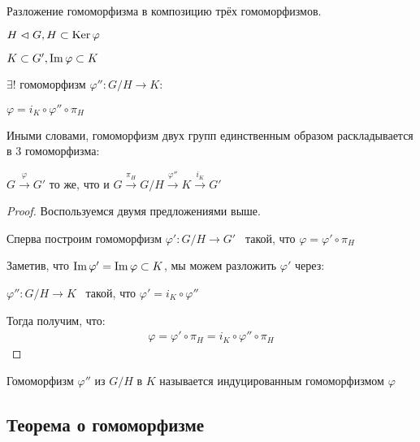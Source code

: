 \begin{theorem}
    Разложение гомоморфизма в композицию трёх гомоморфизмов.

    $H \vartriangleleft G, H \subset \operatorname{Ker} \varphi$

    $K \subset G', \operatorname{Im} \varphi \subset K$

    $\exists !$ гомоморфизм $\varphi'': G / H \to K:$

    $\varphi =  i_K \circ \varphi'' \circ \pi_H$

    Иными словами, гомоморфизм двух групп единственным образом раскладывается в 3 гомоморфизма:

    $G \stackrel{\varphi}{\to} G'$ то же, что и $G \stackrel{\pi_{H}}{\to} G/H \stackrel{\varphi''}{\to} K \stackrel{i_{K}}{\to} G'$

    \begin{proof}
        Воспользуемся двумя предложениями выше.

        Сперва построим гомоморфизм $\varphi': G / H \to G'$ \, такой, что $\varphi = \varphi' \circ \pi_H$

        Заметив, что $\operatorname{Im} \varphi' = \operatorname{Im} \varphi \subset K$, мы можем разложить $\varphi'$ через:

        $\varphi'': G / H \to K$ \, такой, что $\varphi' = i_K \circ \varphi''$

        Тогда получим, что: 
        \begin{gather*}
            \varphi = \varphi' \circ \pi_H = i_K \circ \varphi'' \circ \pi_H
        \end{gather*}
    \end{proof}

    \notice Гомоморфизм $\varphi''$ из $G / H$ в $K$ называется индуцированным гомоморфизмом $\varphi$
\end{theorem}

\subsection{Теорема о гомоморфизме}

